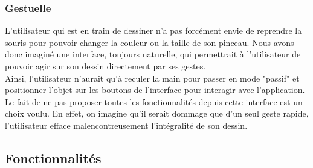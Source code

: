 \documentclass{report}
\begin{document}
			\subsubsection{Gestuelle}
				L'utilisateur qui est en train de dessiner n'a pas forcément envie de reprendre la souris pour pouvoir changer la couleur ou la taille de son pinceau. Nous avons donc imaginé une interface, toujours naturelle, qui permettrait à l'utilisateur de pouvoir agir sur son dessin directement par ses gestes. \\
				Ainsi, l'utilisateur n'aurait qu'à reculer la main pour passer en mode "passif" et positionner l'objet sur les boutons de l'interface pour interagir avec l'application. \\
				Le fait de ne pas proposer toutes les fonctionnalités depuis cette interface est un choix voulu. En effet, on imagine qu'il serait dommage que d'un seul geste rapide, l'utilisateur efface malencontreusement l'intégralité de son dessin. 
		\subsection{Fonctionnalités}
\end{document}
